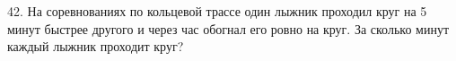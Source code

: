 42. На соревнованиях по кольцевой трассе один лыжник проходил круг на 5 минут быстрее другого и через час обогнал его ровно на круг. За сколько минут каждый лыжник проходит круг?\\
